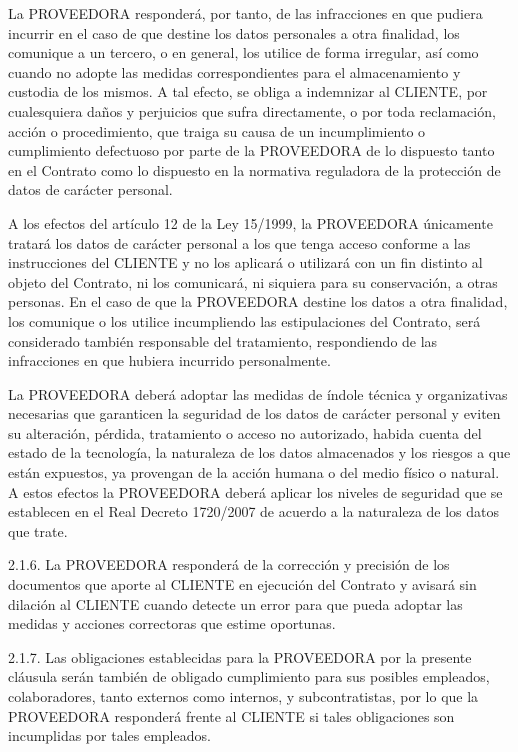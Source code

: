La PROVEEDORA responderá, por tanto, de las infracciones en que pudiera incurrir
en el caso de que destine los datos personales a otra finalidad,
los comunique a un tercero, o en general, los utilice de forma irregular,
así como cuando no adopte las medidas correspondientes para el almacenamiento y custodia de los mismos.
A tal efecto, se obliga a indemnizar al CLIENTE, 
por cualesquiera daños y perjuicios que sufra directamente,
o por toda reclamación, acción o procedimiento,
que traiga su causa de un incumplimiento o cumplimiento defectuoso por parte de la PROVEEDORA
de lo dispuesto tanto en el Contrato
como lo dispuesto en la normativa reguladora de la protección de datos de carácter personal.

A los efectos del artículo 12 de la Ley 15/1999, la PROVEEDORA únicamente tratará los datos de carácter personal a los que tenga acceso conforme a las instrucciones del CLIENTE y no 
los aplicará o utilizará con un fin distinto al objeto del Contrato, ni los comunicará, ni siquiera para su conservación, a otras personas. En el caso de que la PROVEEDORA destine 
los datos a otra finalidad, los comunique o los utilice incumpliendo las estipulaciones del Contrato, será considerado también responsable del tratamiento, respondiendo de las infracciones 
en que hubiera incurrido personalmente. 

La PROVEEDORA deberá adoptar las medidas de índole técnica y organizativas necesarias que garanticen la seguridad de los datos de carácter personal y eviten su alteración, pérdida, tratamiento 
o acceso no autorizado, habida cuenta del estado de la tecnología, la naturaleza de los datos almacenados y los riesgos a que están expuestos, ya provengan de la acción humana o del medio físico 
o natural. A estos efectos la PROVEEDORA deberá aplicar los niveles de seguridad que se establecen en el Real Decreto 1720/2007 de acuerdo a la naturaleza de los datos que trate.

2.1.6. La PROVEEDORA responderá de la corrección y precisión de los documentos que aporte al CLIENTE en ejecución del Contrato y avisará sin dilación al CLIENTE cuando detecte un error para que 
pueda adoptar las medidas y acciones correctoras que estime oportunas.

2.1.7. Las obligaciones establecidas para la PROVEEDORA por la presente cláusula serán también de obligado cumplimiento para sus posibles empleados, colaboradores, tanto externos como internos, 
y subcontratistas, por lo que la PROVEEDORA responderá frente al CLIENTE si tales obligaciones son incumplidas por tales empleados.

